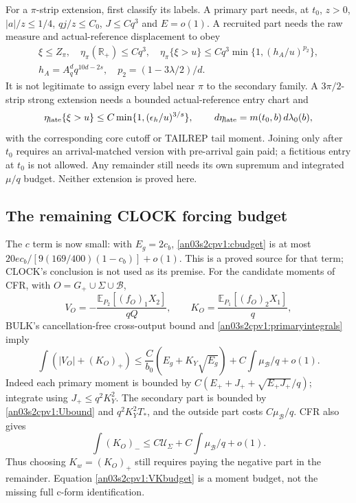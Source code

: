 \documentclass[11pt]{article}
\theoremstyle{remark}\newtheorem{remark}[theorem]{Remark}
\newcommand{\E}{\mathbb E}
\newcommand{\dd}{\,d}
\newcommand{\Gp}{G_+}
\newcommand{\BB}{\mathcal B}
\begin{document}
For a $\pi$-strip extension, first classify its labels. A primary
part needs, at $t_0$, $z>0$, $|a|/z\le1/4$, $qj/z\le C_0$,
$J\le Cq^3$ and $E=o(1)$. A recruited part needs the raw measure
and actual-reference displacement to obey
\begin{equation}
 \begin{gathered}
 \xi\le Z_\pi,\quad \eta_\pi(\mathbb R_+)\le Cq^3,\quad
 \eta_\pi\{\xi>u\}\le Cq^3\min\{1,(h_A/u)^{p_2}\},\\
 h_A=A_q^dq^{10d-2s},\quad p_2=(1-3\lambda/2)/d.
 \end{gathered}
 \label{an03s2cpv1:pistrip}
\end{equation}
It is not legitimate to assign every label near $\pi$ to
the secondary family. A $3\pi/2$-strip strong extension needs
a bounded actual-reference entry chart and
\begin{equation}
 \eta_{\rm late}\{\xi>u\}\le C\min\{1,(\epsilon_h/u)^{3/s}\},
 \qquad \dd\eta_{\rm late}=m(t_0,b)\dd\lambda_0(b),
 \label{an03s2cpv1:latestrip}
\end{equation}
with the corresponding core cutoff or TAILREP tail moment.
Joining only after $t_0$ requires an arrival-matched version
with pre-arrival gain paid; a fictitious entry at $t_0$ is not
allowed. Any remainder still needs its own supremum and
integrated $\mu/q$ budget. Neither extension is proved here.

\subsection*{The remaining CLOCK forcing budget}
The $c$ term is now small: with $E_g=2c_b$,
\eqref{an03s2cpv1:cbudget} is at most
$20e c_b/[9(169/400)(1-c_b)]+o(1)$. This is a proved source
for that term; CLOCK's conclusion is not used as its premise.
For the candidate moments of CFR, with $O=\Gp\cup\Sigma\cup\BB$,
\[
 V_O=-\frac{\E_{P_2}[(f_O)_1X_2]}{qQ},\qquad
 K_O=\frac{\E_{P_1}[(f_O)_2X_1]}q,
\]
BULK's cancellation-free cross-output bound and
\eqref{an03s2cpv1:primaryintegrals} imply
\begin{equation}
 \int(|V_O|+(K_O)_+)
 \le \frac{C}{b_0}(E_g+K_Y\sqrt{E_g})
            +C\int\mu_{\BB}/q+o(1).
 \label{an03s2cpv1:VKbudget}
\end{equation}
Indeed each primary moment is bounded by
$C(E_++J_++\sqrt{E_+J_+}/q)$; integrate using
$J_+\le q^2K_Y^2$. The secondary part is bounded by
\eqref{an03s2cpv1:Ubound} and $q^2K_Y^2T_*$, and the outside
part costs $C\mu_{\BB}/q$. CFR also gives
\[
 \int(K_O)_-\le C\mathcal U_\Sigma
                   +C\int\mu_{\BB}/q+o(1).
\]
Thus choosing $K_w=(K_O)_+$ still requires paying the negative
part in the remainder. Equation \eqref{an03s2cpv1:VKbudget}
is a moment budget, not the missing full c-form identification.
\end{document}
